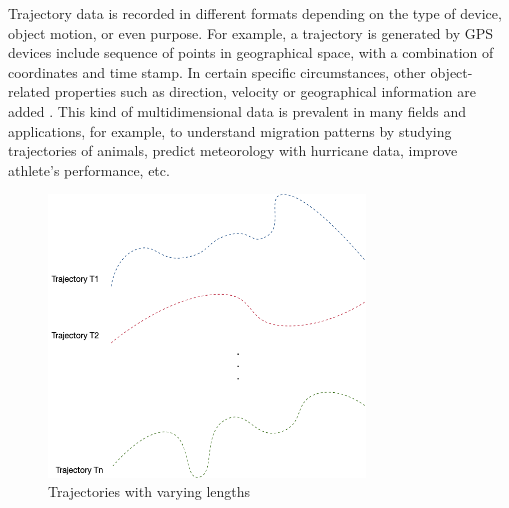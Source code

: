 \documentclass[a4paper, 12pt]{article}
\begin{document}
Trajectory data is recorded in different formats depending on the type of device, object motion, or even purpose. For example, a trajectory is generated by GPS devices include sequence of points in geographical space, with a combination of coordinates and time stamp. In certain specific circumstances, other object-related properties such as direction, velocity or geographical information are added \citep{ying2011semantic,ying2010mining}. This kind of multidimensional data is prevalent in many fields and applications, for example, to understand migration patterns by studying trajectories of animals, predict meteorology with hurricane data, improve athlete’s performance, etc. 

\begin{figure}[ht]
    \centering
    \includegraphics[width=0.75\textwidth]{Trajectories.png}
    \caption{Trajectories with varying lengths}
    \label{fig1}
\end{figure}
\end{document}
